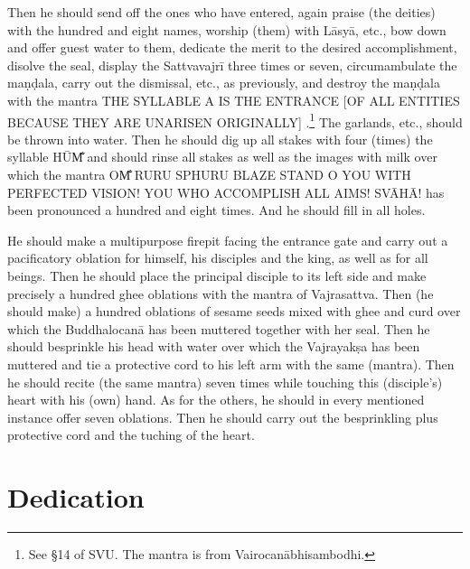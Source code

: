 \documentclass[11pt]{book}
\makeatletter
\def\fakesc#1{%
  \begingroup%
  \xdef\fake@name{\csname\curr@fontshape/\f@size\endcsname}%
  \fontsize{1.3\fontdimen8\fake@name}{\baselineskip}\selectfont%
  \uppercase{#1}%
  \endgroup%
}
\newcommand{\mantra}[1]{\fakesc{#1}}
\makeatother
\begin{document}
Then he should send off the ones who have entered,  again praise (the deities) with the hundred and eight names, worship (them) with Lāsyā, etc., bow down and offer guest water to them, dedicate the merit to the desired accomplishment, disolve the seal, display the Sattvavajrī three times or seven, circumambulate the maṇḍala, carry out the dismissal, etc., as previously, and destroy the maṇḍala with the mantra \mantra{the syllable a is the entrance [of all entities because they are unarisen originally]}.\footnote{See §14 of SVU. The mantra is from Vairocanābhisambodhi.} The garlands, etc., should be thrown into water. Then he should dig up all stakes with four (times) the syllable \mantra{hūm̐} and should rinse all stakes as well as the images with milk over which  the mantra \mantra{om̐ ruru sphuru blaze stand O you with perfected vision! you who accomplish all aims! svāhā!} %
has been pronounced a hundred and eight times. And he should fill in all holes.

He should make a multipurpose firepit facing the entrance gate and carry out a pacificatory oblation for himself, his disciples and the king, as well as for all beings. Then he should place the principal disciple to its left side and make precisely a hundred ghee oblations with the mantra of Vajrasattva. Then (he should make) a hundred oblations of sesame seeds mixed with ghee and curd over which the Buddhalocanā has been muttered together with her seal. Then he should besprinkle his head with water over which the Vajrayakṣa has been muttered and tie a protective cord to his left arm with the same (mantra). Then he should recite (the same mantra) seven times while touching this (disciple's) heart with his (own) hand. As for the others, he should in every mentioned instance offer seven oblations. Then he should carry out the besprinkling plus protective cord and the tuching of the heart.

\section{Dedication}
\end{document}
